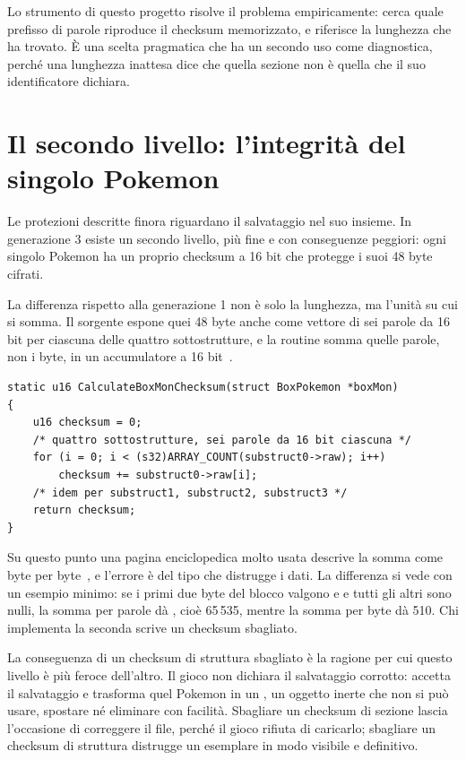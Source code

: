 Lo strumento di questo progetto risolve il problema empiricamente: cerca quale prefisso di
parole riproduce il checksum memorizzato, e riferisce la lunghezza che ha trovato. È una
scelta pragmatica che ha un secondo uso come diagnostica, perché una lunghezza inattesa
dice che quella sezione non è quella che il suo identificatore dichiara.

\section{Il secondo livello: l'integrità del singolo Pokemon}

Le protezioni descritte finora riguardano il salvataggio nel suo insieme. In generazione 3
esiste un secondo livello, più fine e con conseguenze peggiori: ogni singolo Pokemon ha un
proprio checksum a 16 bit che protegge i suoi 48 byte cifrati.

La differenza rispetto alla generazione 1 non è solo la lunghezza, ma l'unità su cui si
somma. Il sorgente espone quei 48 byte anche come vettore di sei parole da 16 bit per
ciascuna delle quattro sottostrutture, e la routine somma quelle parole, non i byte, in un
accumulatore a 16 bit~\cite{pokeemerald}.

\begin{lstlisting}[style=c,caption={Il checksum della struttura, da \texttt{include/pokemon.h} e \texttt{src/pokemon.c}. Il tipo dell'accumulatore è la parte che conta.}]
static u16 CalculateBoxMonChecksum(struct BoxPokemon *boxMon)
{
    u16 checksum = 0;
    /* quattro sottostrutture, sei parole da 16 bit ciascuna */
    for (i = 0; i < (s32)ARRAY_COUNT(substruct0->raw); i++)
        checksum += substruct0->raw[i];
    /* idem per substruct1, substruct2, substruct3 */
    return checksum;
}
\end{lstlisting}

Su questo punto una pagina enciclopedica molto usata descrive la somma come byte per
byte~\cite{bulbapedia}, e l'errore è del tipo che distrugge i dati. La differenza si vede
con un esempio minimo: se i primi due byte del blocco valgono  e  e tutti
gli altri sono nulli, la somma per parole dà , cioè 65\,535, mentre la somma per
byte dà 510. Chi implementa la seconda scrive un checksum sbagliato.

La conseguenza di un checksum di struttura sbagliato è la ragione per cui questo livello è
più feroce dell'altro. Il gioco non dichiara il salvataggio corrotto: accetta il
salvataggio e trasforma quel Pokemon in un , un oggetto inerte che non si
può usare, spostare né eliminare con facilità. Sbagliare un checksum di sezione lascia
l'occasione di correggere il file, perché il gioco rifiuta di caricarlo; sbagliare un
checksum di struttura distrugge un esemplare in modo visibile e definitivo.

